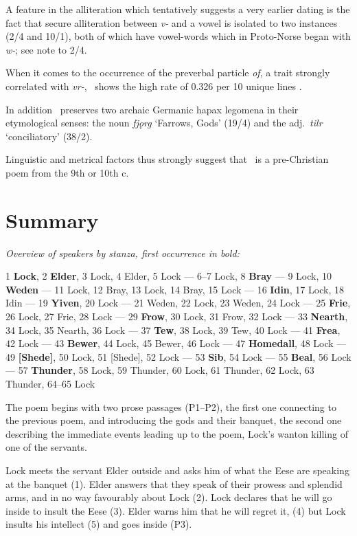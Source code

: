 A feature in the alliteration which tentatively suggests a very earlier dating is the fact that secure alliteration between \emph{v-} and a vowel is isolated to two instances (2/4 and 10/1), both of which have vowel-words which in Proto-Norse began with \emph{w-}; see note to 2/4.

When it comes to the occurrence of the preverbal particle \emph{of}, a trait strongly correlated with \emph{vr-}, \Lokasenna\ shows the high rate of 0.326 per 10 unique lines \parencites[54]{Haukur2016}[70]{Sapp2022}.

In addition \Lokasenna\ preserves two archaic Germanic hapax legomena in their etymological senses: the noun \emph{fjǫrg} ‘Farrows, Gods’ (19/4) and the adj.~\emph{tilr} ‘conciliatory’ (38/2).

Linguistic and metrical factors thus strongly suggest that \Lokasenna\ is a pre-Christian poem from the 9th or 10th c.

\section{Summary}

\emph{Overview of speakers by stanza, first occurrence in bold:}

\begin{small}
1 \textbf{Lock}, 2 \textbf{Elder}, 3 Lock, 4 Elder, 5 Lock ---
6--7 Lock, 8 \textbf{Bray} ---
9 Lock, 10 \textbf{Weden} ---
11 Lock, 12 Bray, 13 Lock, 14 Bray, 15 Lock ---
16 \textbf{Idin}, 17 Lock, 18 Idin ---
19 \textbf{Yiven}, 20 Lock ---
21 Weden, 22 Lock, 23 Weden, 24 Lock ---
25 \textbf{Frie}, 26 Lock, 27 Frie, 28 Lock ---
29 \textbf{Frow}, 30 Lock, 31 Frow, 32 Lock ---
33 \textbf{Nearth}, 34 Lock, 35 Nearth, 36 Lock ---
37 \textbf{Tew}, 38 Lock, 39 Tew, 40 Lock ---
41 \textbf{Frea}, 42 Lock ---
43 \textbf{Bewer}, 44 Lock, 45 Bewer, 46 Lock ---
47 \textbf{Homedall}, 48 Lock ---
49 \textbf{[Shede]}, 50 Lock, 51 [Shede], 52 Lock ---
53 \textbf{Sib}, 54 Lock ---
55 \textbf{Beal}, 56 Lock ---
57 \textbf{Thunder}, 58 Lock, 59 Thunder, 60 Lock, 61 Thunder, 62 Lock, 63 Thunder, 64--65 Lock
\end{small}

The poem begins with two prose passages (P1--P2), the first one connecting to the previous poem,  and introducing the gods and their banquet, the second one describing the immediate events leading up to the poem, Lock’s wanton killing of one of the servants.

Lock meets the servant Elder outside and asks him of what the Eese are speaking at the banquet (1).  Elder answers that they speak of their prowess and splendid arms, and in no way favourably about Lock (2).  Lock declares that he will go inside to insult the Eese (3).  Elder warns him that he will regret it, (4) but Lock insults his intellect (5) and goes inside (P3).

